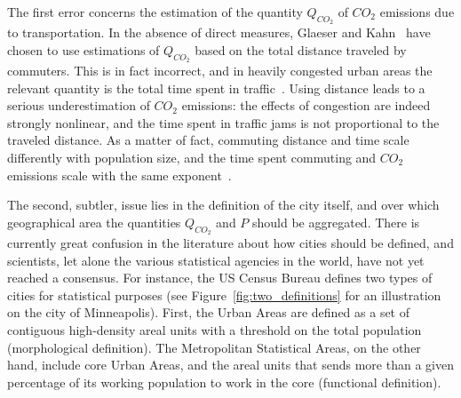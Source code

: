 The first error concerns the estimation of the quantity $Q_{CO_2}$ of $CO_2$ emissions due to
transportation. In the absence of direct measures, Glaeser and Kahn~\cite{Glaeser:2010} have chosen
to use estimations of $Q_{CO_2}$ based on the total distance traveled by commuters. This is in fact
incorrect, and in heavily congested urban areas the relevant quantity is the total time spent
in traffic~\cite{Louf:2014_mobility}. Using distance leads to a serious underestimation of
$CO_2$ emissions: the effects of congestion are indeed strongly nonlinear, and the time spent
in traffic jams is not proportional to the traveled distance. As a matter of fact, commuting
distance and time scale differently with population size, and the time spent commuting and
$CO_2$ emissions scale with the same exponent~\cite{Louf:2014_mobility}.

The second, subtler, issue lies in the definition of the city itself, and over
which geographical area the quantities $Q_{CO_2}$ and $P$ should be aggregated.
There is currently great confusion in the literature about how cities should be
defined, and scientists, let alone the various statistical agencies in the
world, have not yet reached a consensus. For instance, the US Census Bureau
defines two types of cities for statistical purposes
(see Figure~\ref{fig:two_definitions} for an illustration on the city of Minneapolis).
First, the Urban Areas are defined as a set of contiguous high-density areal
units with a threshold on the total population (morphological definition). The Metropolitan Statistical
Areas, on the other hand, include core Urban Areas, and the areal units that
sends more than a given percentage of its working population to work in the
core (functional definition).

